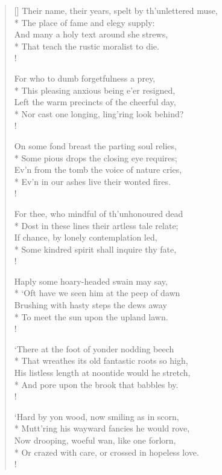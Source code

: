 \documentclass[MAIN]{subfiles}
\begin{document}
\begin{verse}[\versewidth]
Their name, their years, spelt by th'unlettered muse,\\*
The place of fame and elegy supply:\\
And many a holy text around she strews,\\*
That teach the rustic moralist to die.\\!

For who to dumb forgetfulness a prey,\\*
This pleasing anxious being e'er resigned,\\
Left the warm precincts of the cheerful day,\\*
Nor cast one longing, ling'ring look behind?\\!

On some fond breast the parting soul relies,\\*
Some pious drops the closing eye requires;\\
Ev'n from the tomb the voice of nature cries,\\*
Ev'n in our ashes live their wonted fires.\\!

For thee, who mindful of th'unhonoured dead\\*
Dost in these lines their artless tale relate;\\
If chance, by lonely contemplation led,\\*
Some kindred spirit shall inquire thy fate,\\!

Haply some hoary-headed swain may say,\\*
`Oft have we seen him at the peep of dawn\\
Brushing with hasty steps the dews away\\*
To meet the sun upon the upland lawn.\\!

`There at the foot of yonder nodding beech\\*
That wreathes its old fantastic roots so high,\\
His listless length at noontide would he stretch,\\*
And pore upon the brook that babbles by.\\!

`Hard by yon wood, now smiling as in scorn,\\*
Mutt'ring his wayward fancies he would rove,\\
Now drooping, woeful wan, like one forlorn,\\*
Or crazed with care, or crossed in hopeless love.\\!


\end{verse}
\end{document}
